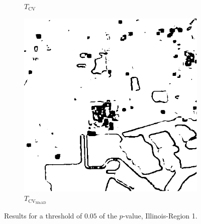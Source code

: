\begin{figure}[H]
\begin{subfigure}[b]{0.3\textwidth}
    \caption{$T_\text{CV}$}
    \label{fig:lake_0.05-2}
  \end{subfigure}
  \hfill
  \begin{subfigure}[b]{0.3\textwidth}
    \centering
    \includegraphics[width=\textwidth]{../../Figures/PNG/mnad_005_lake_512}
     \caption{$T_{\text{CV}_{\text{MnAD}}}$}
    \label{fig:lake_0.05-3}
  \end{subfigure}
  \caption{Results for a threshold of $0.05$ of the $p$-value, Illinois-Region 1. }
  \label{fig:lake_0.05}
\end{figure}




